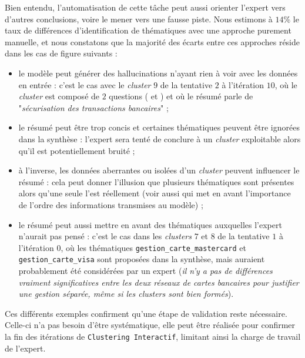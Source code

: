 			Bien entendu, l'automatisation de cette tâche peut aussi orienter l'expert vers d'autres conclusions, voire le mener vers une fausse piste.
			Nous estimons à $14$\% le taux de différences d'identification de thématiques avec une approche purement manuelle, et nous constatons que la majorité des écarts entre ces approches réside dans les cas de figure suivants :
			\begin{itemize}
				\item le modèle peut générer des hallucinations n'ayant rien à voir avec les données en entrée : c'est le cas avec le \textit{cluster} $9$ de la tentative $2$ à l'itération $10$, où le \textit{cluster} est composé de $2$ questions ( et ) et où le résumé parle de "\textit{sécurisation des transactions bancaires}" ;
				\item le résumé peut être trop concis et certaines thématiques peuvent être ignorées dans la synthèse : l'expert sera tenté de conclure à un \textit{cluster} exploitable alors qu'il est potentiellement bruité ;
				\item à l'inverse, les données aberrantes ou isolées d'un \textit{cluster} peuvent influencer le résumé : cela peut donner l'illusion que plusieurs thématiques sont présentes alors qu'une seule l'est réellement (voir aussi \cite{falke-etal:2019:ranking-generated-summaries} qui met en avant l'importance de l'ordre des informations transmises au modèle) ;
				\item le résumé peut aussi mettre en avant des thématiques auxquelles l'expert n'aurait pas pensé : c'est le cas dans les \textit{clusters} $7$ et $8$ de la tentative $1$ à l'itération $0$, où les thématiques \texttt{gestion\_carte\_mastercard} et \texttt{gestion\_carte\_visa} sont proposées dans la synthèse, mais auraient probablement été considérées par un expert (\textit{il n'y a pas de différences vraiment significatives entre les deux réseaux de cartes bancaires pour justifier une gestion séparée, même si les \textit{clusters} sont bien formés}).
			\end{itemize}
			
			Ces différents exemples confirment qu'une étape de validation reste nécessaire.
			Celle-ci n'a pas besoin d'être systématique, elle peut être réalisée pour confirmer la fin des itérations de \texttt{Clustering Interactif}, limitant ainsi la charge de travail de l'expert.
			
